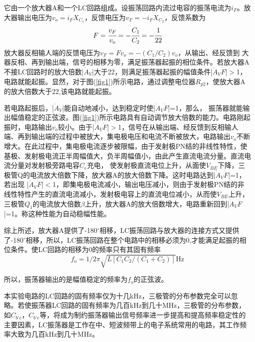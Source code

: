 \documentclass[a4paper]{article}
\begin{document}
它由一个放大器A和一个LC回路组成。设振荡回路内流过电容的振荡电流为$i_F$。放大器输出电压为$v_o = i_FX_{C_1}$，反馈电压为$v_F = -i_FX_{C_2}$，反馈系数为
\begin{equation}
F = \cfrac{v_F}{v_o} = -\cfrac{C_1}{C_2} = -\cfrac{1}{22}\label{eq1}
\end{equation}
放大器反相输人端的反馈电压为$v_F = Fv_o = -(C_1/C_2)v_o$，从输出、经反馈到 大器反相、再到输出端，信号的相移为零，满足振荡器起振的相位条件。若放大器A不接LC回路时的放大倍数|$\dot{A}_V$|大于22，则满足振荡器起振的幅值条件|$\dot{A}_V\dot{F}$|$>$1，电路就能起振。显然，对于图(\ref{fig1})所示电路，通过调整电位器$R_{p2}$，使放大器A的放大倍数大于22,该电路就能起振。

若电路起振后，|$\dot{A}_V$|能自动地减小，达到稳定时使|$\dot{A}_V\dot{F}$|=1，那么，
振荡器就能输出幅值稳定的正弦波。图(\ref{fig1})所示电路具有自动调节放大倍数的能力。电路刚起振时，电路输出$v_o$较小。由于|$\dot{A}_V\dot{F}$|$>$1，信号在从输出端、经反馈到反相输人端、再到输出端的过程中被放大，集电极电压和电流不断被放大，电路输出$v_o$不断增大。在此过程中，集电极电流逐步被限幅，由于发射极PN结的非线性特性，使基极、发射极电流正半周幅值大，负半周幅值小，由此产生直流电流分量。直流电流分量对发射极旁路电容$C_e$充电， 使发射极直流电位上升，从面使$V_{BE}$下降，三极管Q的电流放大倍数下降，放大器A的放大倍数下降。这时电路达到|$\dot{A}_V\dot{F}$|=1，若出现
|$\dot{A}_V\dot{F}$|$<$1，即集电极电流减小，输出电压减小，则由于发射极PN结的非线性特性产生的直流电流减小，发射极电容上的直流电位减小，从而使$V_{BE}$上升，三极管$Q_1$的电流放大倍数$\beta$上升，放大器A的放大倍数增大，电路重新回到|$\dot{A}_V\dot{F}$|=1。称这种性能为自动稳幅性能。

综上所述，放大器A提供了-180$^{\circ}$相移，LC振荡回路与放大器的连接方式又提供了-180$^{\circ}$相移，所以，LC振荡回路在整个电路中的相移必须为0,才能满足起振的相位条件。使LC回路的相移为0的频率只有其固有频率
\begin{equation}
f_o = 1/2\pi\sqrt{L[C_1C_2/(C_1+C_2)]}\text{Hz}\label{eq2}
\end{equation}

所以，振荡器输出的是幅值稳定的频率为$f_o$的正弦波。

本实验电路的LC回路的固有频率仅为十几kHz，三极管的分布参数完全可以忽略。若使振荡器LC回路的固有频率为几百kHz到几十MHz，三极管的分布参数，如$C_{b'c}$，$C_{b'e}$等，将成为制约振荡器输出信号频率进一步提高和提高频率稳定性的主要因素，LC振荡器是工作在中、短波频带上的电子系统常用的电路，其工作频率大致为几百kHz到几十MHz。
\end{document}
